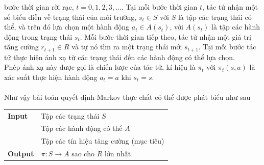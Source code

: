 \documentclass[12pt,a4paper]{report}
\begin{document}
bước thời gian rời rạc, $t = 0,1,2,3,...$. Tại mỗi bước thời gian $t$, tác tử nhận một số biểu diễn về trạng thái của môi trường, $s_t \in S$ với $S$ là tập các trạng thái có thể, và trên đó lựa chọn một
hành động $a_t\in A(s_t)$, với $A(s_t)$ là tập các hành động trong trạng thái $s_t$. Mỗi bước thời gian
tiếp theo, tác tử nhận một giá trị tăng cường $r_{t+1} \in R$ và tự nó tìm ra một trạng thái mới $s_{t+1}$.
Tại mỗi bước tác tử thực hiện ánh xạ từ các trạng thái đến các hành động có thể lựa chọn. \\
Phép ánh xạ này được gọi là chiến lược của tác tử, kí hiệu là $\pi_t$ với $\pi_t(s, a)$ là xác suất thực
hiện hành động $a_t = a$ khi $s_t = s$.\\\\Như vậy bài toán quyết định Markov thực chất có thể được phát biểu như sau
\begin{center}
	\begin{tabular}{l|l}
		\textbf{Input} & Tập các trạng thái $S$ \\ &Tập các hành động có thể $A$ \\ & Tập các tín hiệu tăng cường (mục tiêu) \\
		\hline
		\textbf{Output} & $\pi : S \to A$ sao cho $R$ lớn nhất
	\end{tabular}
\end{center}
\end{document}
